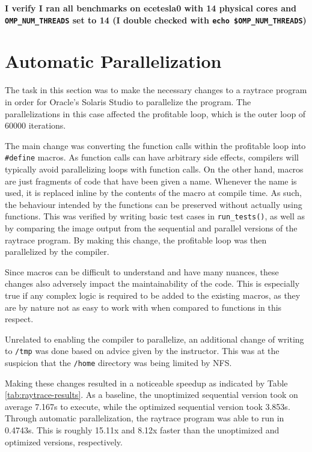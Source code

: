 \documentclass[12pt,reqno]{article}
\begin{document}

{\bf I verify I ran all benchmarks on ecetesla0 with 14 physical cores and
{\tt OMP\_NUM\_THREADS} set to 14 (I double checked with
{\tt echo \$OMP\_NUM\_THREADS})}

\section*{Automatic Parallelization}

The task in this section was to make the necessary changes to a raytrace program in order for Oracle's Solaris Studio to parallelize the program. The parallelizations in this case affected the profitable loop, which is the outer loop of 60000 iterations. 

The main change was converting the function calls within the profitable loop into \texttt{\#define} macros. As function calls can have arbitrary side effects, compilers will typically avoid parallelizing loops with function calls. On the other hand, macros are just fragments of code that have been given a name. Whenever the name is used, it is replaced inline by the contents of the macro at compile time. As such, the behaviour intended by the functions can be preserved without actually using functions. This was verified by writing basic test cases in \texttt{run\_tests()}, as well as by comparing the image output from the sequential and parallel versions of the raytrace program. By making this change, the profitable loop was then parallelized by the compiler. 

Since macros can be difficult to understand and have many nuances, these changes also adversely impact the maintainability of the code. This is especially true if any complex logic is required to be added to the existing macros, as they are by nature not as easy to work with when compared to functions in this respect.

Unrelated to enabling the compiler to parallelize, an additional change of writing to \texttt{/tmp} was done based on advice given by the instructor. This was at the suspicion that the \texttt{/home} directory was being limited by NFS.

Making these changes resulted in a noticeable speedup as indicated by Table \ref{tab:raytrace-results}. As a baseline, the unoptimized sequential version took on average 7.167s to execute, while the optimized sequential version took 3.853s. Through automatic parallelization, the raytrace program was able to run in 0.4743s. This is roughly 15.11x and 8.12x faster than the unoptimized and optimized versions, respectively. 
\end{document}
